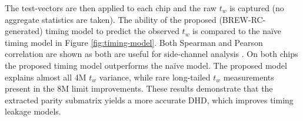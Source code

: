 The test-vectors are then applied to each chip and the raw $t_{w}$ is captured (no aggregate statistics are taken). The ability of the proposed (BREW-RC-generated) timing model to predict the observed $t_{w}$ is compared to the na\"ive timing model in Figure \ref{fig:timing-model}. Both Spearman and Pearson correlation are shown as both are useful for side-channel analysis \cite{batina2008comparative}. On both chips the proposed timing model outperforms the na\"ive model. The proposed model explains almost all 4M $t_w$ variance, while rare long-tailed $t_w$ measurements present in the 8M limit improvements. These results demonstrate that the extracted parity submatrix yields a more accurate DHD, which improves timing leakage models.


